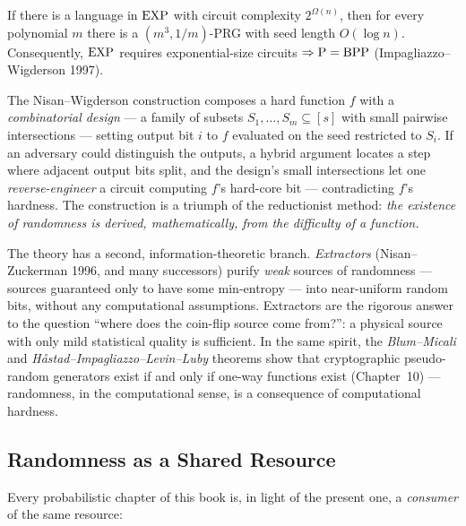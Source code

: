 \begin{theorem}
If there is a language in $\text{EXP}$ with circuit complexity $2^{\Omega(n)}$, then for every polynomial $m$ there is a $(m^3, 1/m)$-PRG with seed length $O(\log n)$. Consequently, $\text{EXP}$ requires exponential-size circuits $\Rightarrow \text{P} = \text{BPP}$ (Impagliazzo--Wigderson 1997).
\end{theorem}

The Nisan--Wigderson construction composes a hard function $f$ with a \emph{combinatorial design} --- a family of subsets $S_1, \dots, S_m \subseteq [s]$ with small pairwise intersections --- setting output bit $i$ to $f$ evaluated on the seed restricted to $S_i$. If an adversary could distinguish the outputs, a hybrid argument locates a step where adjacent output bits split, and the design's small intersections let one \emph{reverse-engineer} a circuit computing $f$'s hard-core bit --- contradicting $f$'s hardness. The construction is a triumph of the reductionist method: \emph{the existence of randomness is derived, mathematically, from the difficulty of a function.}

The theory has a second, information-theoretic branch. \emph{Extractors} (Nisan--Zuckerman 1996, and many successors) purify \emph{weak} sources of randomness --- sources guaranteed only to have some min-entropy --- into near-uniform random bits, without any computational assumptions. Extractors are the rigorous answer to the question ``where does the coin-flip source come from?'': a physical source with only mild statistical quality is sufficient. In the same spirit, the \emph{Blum--Micali} and \emph{H{\aa}stad--Impagliazzo--Levin--Luby} theorems show that cryptographic pseudo-random generators exist if and only if one-way functions exist (Chapter~10) --- randomness, in the computational sense, is a consequence of computational hardness.

\subsection{Randomness as a Shared Resource}
\label{sec:randomized:shared}

Every probabilistic chapter of this book is, in light of the present one, a \emph{consumer} of the same resource:

